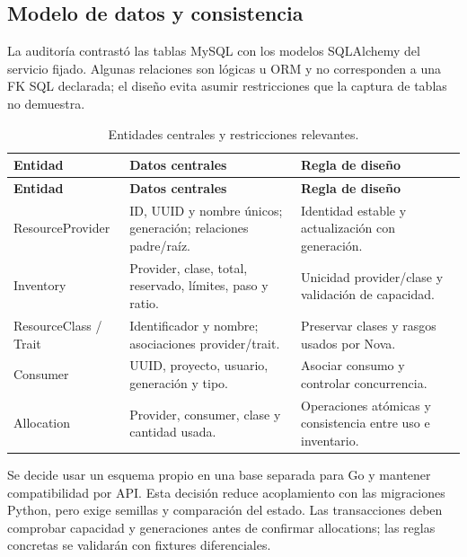 \documentclass[12pt,a4paper]{article}
\newcommand{\reporttable}[4]{\begingroup\small\setlength{\LTpre}{8pt}\setlength{\LTpost}{8pt}\setlength{\tabcolsep}{4pt}\renewcommand{\arraystretch}{1.15}
\begin{longtable}{#2}\caption{#1}\\\toprule #3\\\midrule\endfirsthead
\toprule #3\\\midrule\endhead\bottomrule\endfoot #4\end{longtable}\endgroup}
\begin{document}
\subsection{Modelo de datos y consistencia}
La auditoría contrastó las tablas MySQL con los modelos SQLAlchemy del servicio fijado. Algunas relaciones son lógicas u ORM y no corresponden a una FK SQL declarada; el diseño evita asumir restricciones que la captura de tablas no demuestra.
\reporttable{Entidades centrales y restricciones relevantes.}{>{\raggedright\arraybackslash}p{3.6cm}>{\raggedright\arraybackslash}p{6.2cm}>{\raggedright\arraybackslash}p{5.2cm}}{\textbf{Entidad}&\textbf{Datos centrales}&\textbf{Regla de diseño}}{
ResourceProvider&ID, UUID y nombre únicos; generación; relaciones padre/raíz.&Identidad estable y actualización con generación.\\*
Inventory&Provider, clase, total, reservado, límites, paso y ratio.&Unicidad provider/clase y validación de capacidad.\\*
ResourceClass / Trait&Identificador y nombre; asociaciones provider/trait.&Preservar clases y rasgos usados por Nova.\\*
Consumer&UUID, proyecto, usuario, generación y tipo.&Asociar consumo y controlar concurrencia.\\*
Allocation&Provider, consumer, clase y cantidad usada.&Operaciones atómicas y consistencia entre uso e inventario.\\}
Se decide usar un esquema propio en una base separada para Go y mantener compatibilidad por API. Esta decisión reduce acoplamiento con las migraciones Python, pero exige semillas y comparación del estado. Las transacciones deben comprobar capacidad y generaciones antes de confirmar allocations; las reglas concretas se validarán con fixtures diferenciales.
\end{document}
